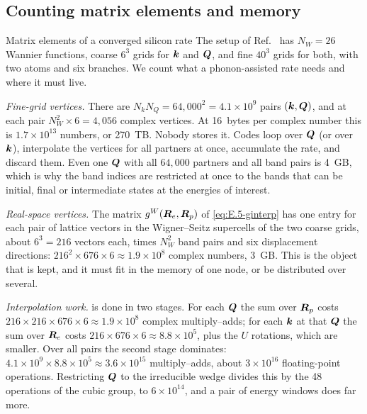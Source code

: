 \subsection{Counting matrix elements and memory}

\begin{workedexample}{Matrix elements of a converged silicon rate}\label{we:E-counts}
The setup of Ref.~\cite{noffsinger2012phonon} has $N_W = 26$ Wannier functions, coarse $6^3$ grids for $\bm{k}$ and $\bm{Q}$, and fine $40^3$ grids for both, with two atoms and six branches. We count what a phonon-assisted rate needs and where it must live.

\emph{Fine-grid vertices.} There are $N_k N_Q = 64{,}000^2 = 4.1\times10^9$ pairs $(\bm{k},\bm{Q})$, and at each pair $N_W^2\times6 = 4{,}056$ complex vertices. At \SI{16}{bytes} per complex number this is $1.7\times10^{13}$ numbers, or \SI{270}{TB}. Nobody stores it. Codes loop over $\bm{Q}$ (or over $\bm{k}$), interpolate the vertices for all partners at once, accumulate the rate, and discard them. Even one $\bm{Q}$ with all $64{,}000$ partners and all band pairs is \SI{4}{GB}, which is why the band indices are restricted at once to the bands that can be initial, final or intermediate states at the energies of interest.

\emph{Real-space vertices.} The matrix $g^W(\bm{R}_e,\bm{R}_p)$ of \cref{eq:E.5-ginterp} has one entry for each pair of lattice vectors in the Wigner--Seitz supercells of the two coarse grids, about $6^3 = 216$ vectors each, times $N_W^2$ band pairs and six displacement directions: $216^2\times676\times6 \approx 1.9\times10^8$ complex numbers, \SI{3}{GB}. This is the object that is kept, and it must fit in the memory of one node, or be distributed over several.

\emph{Interpolation work.}  is done in two stages. For each $\bm{Q}$ the sum over $\bm{R}_p$ costs $216\times216\times676\times6 \approx 1.9\times10^8$ complex multiply--adds; for each $\bm{k}$ at that $\bm{Q}$ the sum over $\bm{R}_e$ costs $216\times676\times6 \approx 8.8\times10^5$, plus the $U$ rotations, which are smaller. Over all pairs the second stage dominates: $4.1\times10^9\times8.8\times10^5 \approx 3.6\times10^{15}$ multiply--adds, about $3\times10^{16}$ floating-point operations. Restricting $\bm{Q}$ to the irreducible wedge divides this by the 48 operations of the cubic group, to $6\times10^{14}$, and a pair of energy windows does far more.


\end{workedexample}
